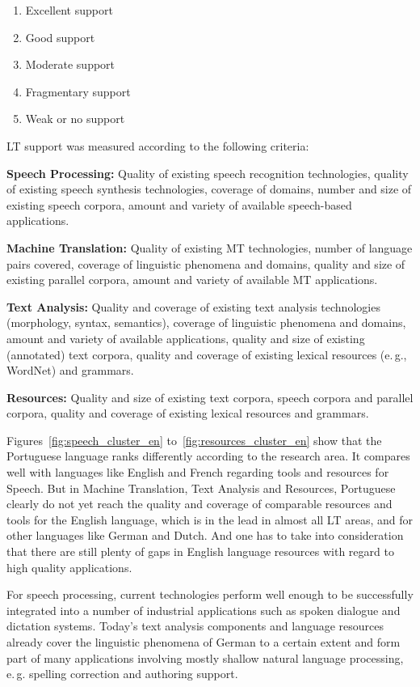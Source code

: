 \documentclass[]{../metanetpaper}
\begin{document}
\begin{multicols}{2}
\begin{enumerate}
\item Excellent support
\item Good support
\item Moderate support
\item Fragmentary support
\item Weak or no support
\end{enumerate}

LT support was measured according to the following criteria:

\textbf{Speech Processing:} Quality of existing speech recognition technologies, quality of existing speech synthesis technologies, coverage of domains, number and size of existing speech corpora, amount and variety of available speech-based applications.

\textbf{Machine Translation:} Quality of existing MT technologies, number of language pairs covered, coverage of linguistic phenomena and domains, quality and size of existing parallel corpora, amount and variety of available MT applications.

\textbf{Text Analysis:} Quality and coverage of existing text analysis technologies (morphology, syntax, semantics), coverage of linguistic phenomena and domains, amount and variety of available applications, quality and size of existing (annotated) text corpora, quality and coverage of existing lexical resources (e.\,g., WordNet) and grammars.

\textbf{Resources:} Quality and size of existing text corpora, speech corpora and parallel corpora, quality and coverage of existing lexical resources and grammars.

Figures~\ref{fig:speech_cluster_en} to~\ref{fig:resources_cluster_en} show that the Portuguese language ranks differently according to the research area. It compares well with languages like English and French regarding tools and resources for Speech. But in Machine Translation, Text Analysis and Resources, Portuguese clearly do not yet reach the quality and coverage of comparable resources and tools for the English language, which is in the lead in almost all LT areas, and for other languages like German and Dutch. And one has to take into consideration that there are still plenty of gaps in English language resources with regard to high quality applications.

For speech processing, current technologies perform well enough to be successfully integrated into a number of industrial applications such as spoken dialogue and dictation systems. Today’s text analysis components and language resources already cover the linguistic phenomena of German to a certain extent and form part of many applications involving mostly shallow natural language processing, e.\,g. spelling correction and authoring support.


\end{multicols}
\end{document}
